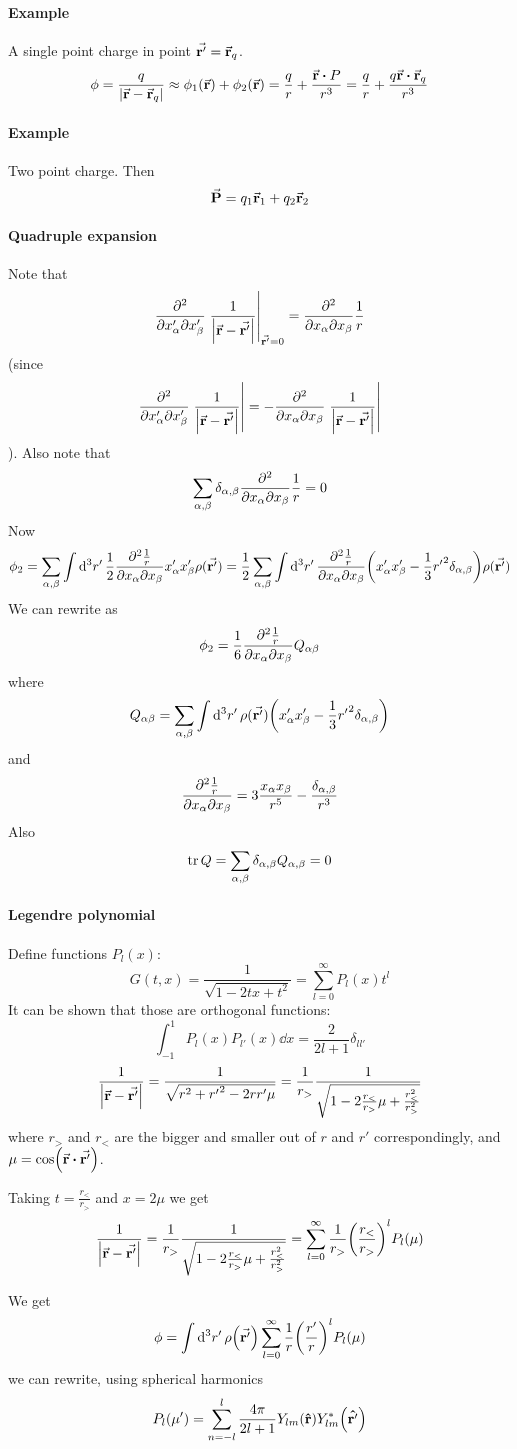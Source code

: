 \paragraph{Example}
A single point charge in point $\va{r'} = \va{r}_q$.
$$\phi = \frac{q}{\qty|\va{r} - \va{r}_q|} \approx \phi_1\qty(\va{r}) + \phi_2\qty(\va{r}) = \frac{q}{r} + \frac{\va{r} \vdot P}{r^3} = \frac{q}{r}+ \frac{q \va{r} \vdot \va{r}_q}{r^3}$$
\paragraph{Example}
Two point charge. Then
$$\va{P} = q_1 \va{r}_1 + q_2 \va{r}_2$$
\paragraph{Quadruple expansion}
Note that
$$\pdv{}{x'_\alpha}{x'_\beta} \eval{\frac{1}{\qty|\va{r} - \va{r'}|}}_{\va{r'}=0} = \pdv{}{x_\alpha}{x_\beta} \frac{1}{r}$$
(since $$\pdv{}{x'_\alpha}{x'_\beta} \eval{\frac{1}{\qty|\va{r} - \va{r'}|}} = - \pdv{}{x_\alpha}{x_\beta} \eval{\frac{1}{\qty|\va{r} - \va{r'}|}}$$).
Also note that
$$\sum_{\alpha, \beta} \delta_{\alpha, \beta} \pdv{}{x_\alpha}{x_\beta} \frac{1}{r} = 0$$
Now
$$\phi_2 = \sum_{\alpha, \beta}\int \dd[3]{r'} \frac{1}{2} \pdv{\frac{1}{r}}{x_\alpha}{x_\beta} x'_\alpha x'_\beta \rho(\va{r'}) = \frac{1}{2} \sum_{\alpha, \beta} \int \dd[3]{r'} \pdv{\frac{1}{r}}{x_\alpha}{x_\beta} \qty( x'_\alpha x'_\beta - \frac{1}{3} {r'}^2 \delta_{\alpha, \beta}) \rho(\va{r'}) $$
We can rewrite as
$$\phi_2  = \frac{1}{6} \pdv{\frac{1}{r}}{x_\alpha}{x_\beta} Q_{\alpha \beta}$$
where
$$Q_{\alpha \beta}= \sum_{\alpha, \beta} \int \dd[3]{r'} \rho(\va{r'}) \qty( x'_\alpha x'_\beta - \frac{1}{3} {r'}^2 \delta_{\alpha, \beta})   $$
and
$$\pdv{\frac{1}{r}}{x_\alpha}{x_\beta} = 3 \frac{x_\alpha x_\beta}{r^5} - \frac{\delta_{\alpha, \beta}}{r^3}$$
Also
$$\tr Q = \sum_{\alpha, \beta} \delta_{\alpha, \beta} Q_{\alpha, \beta} = 0$$
\paragraph{Legendre polynomial}
Define functions $P_l(x)$:
$$G(t,x) = \frac{1}{\sqrt{1-2tx +t^2}} = \sum_{l=0}^\infty P_l(x) t^l$$
It can be shown that those are orthogonal functions:
$$\int_{-1}^1 P_l(x) P_{l'}(x) \dd{x} = \frac{2}{2l+1} \delta_{ll'}$$
$$\frac{1}{\qty|\va{r} - \va{r'}|} = \frac{1}{\sqrt{r^2+{r'}^2 -2rr'\mu }} = \frac{1}{r_>} \frac{1}{\sqrt{1-2\frac{r_<}{r_>} \mu + \frac{r_<^2}{r_>^2}}} $$
where $r_>$ and $r_<$ are the bigger and smaller out of $r$ and $r'$ correspondingly, and $\mu = \cos(\va{r} \vdot \va{r'})$.

Taking $t=\frac{r_<}{r_>}$ and $x=2\mu$ we get
$$\frac{1}{\qty|\va{r} - \va{r'}|} = \frac{1}{r_>} \frac{1}{\sqrt{1-2\frac{r_<}{r_>} \mu + \frac{r_<^2}{r_>^2}}}  = \sum_{l=0}^\infty \frac{1}{r_>}\qty(\frac{r_<}{r_>})^l P_l(\mu)$$

We get
$$\phi = \int \dd[3]{r'} \rho\qty(\va{r'}) \sum_{l=0}^\infty \frac{1}{r} \qty(\frac{r'}{r})^l P_l(\mu) $$
we can rewrite, using spherical harmonics
$$P_l(\mu') = \sum_{n=-l}^l \frac{4\pi}{2l+1} Y_{lm}\qty(\vu{r})Y^*_{lm}\qty(\vu{r'})$$